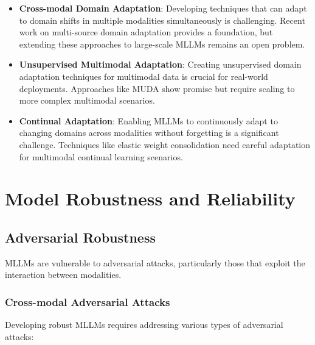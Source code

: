 \begin{itemize}
    \item \textbf{Cross-modal Domain Adaptation}: Developing techniques that can adapt to domain shifts in multiple modalities simultaneously is challenging. Recent work on multi-source domain adaptation \citep{peng2019moment} provides a foundation, but extending these approaches to large-scale MLLMs remains an open problem.
    
    \item \textbf{Unsupervised Multimodal Adaptation}: Creating unsupervised domain adaptation techniques for multimodal data is crucial for real-world deployments. Approaches like MUDA \citep{yang2020muda} show promise but require scaling to more complex multimodal scenarios.
    
    \item \textbf{Continual Adaptation}: Enabling MLLMs to continuously adapt to changing domains across modalities without forgetting is a significant challenge. Techniques like elastic weight consolidation \citep{kirkpatrick2017overcoming} need careful adaptation for multimodal continual learning scenarios.
\end{itemize}

\section{Model Robustness and Reliability}

\subsection{Adversarial Robustness}
MLLMs are vulnerable to adversarial attacks, particularly those that exploit the interaction between modalities.

\subsubsection{Cross-modal Adversarial Attacks}
Developing robust MLLMs requires addressing various types of adversarial attacks:

